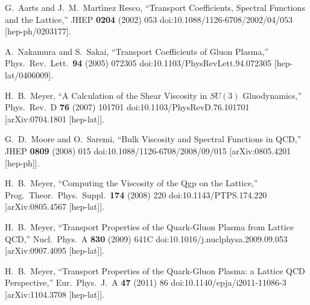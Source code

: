 \documentclass[a4paper,11pt]{article}
\begin{document}
\begin{thebibliography}{99}
  
  G.~Aarts and J.~M.~Mart{\'\i ne}z Resco,
  ``Transport Coefficients, Spectral Functions and the Lattice,''
  JHEP {\bf 0204} (2002) 053
  doi:10.1088/1126-6708/2002/04/053
  [hep-ph/0203177].


  A.~Nakamura and S.~Sakai,
  ``Transport Coefficients of Gluon Plasma,''
  Phys.\ Rev.\ Lett.\  {\bf 94} (2005) 072305
  doi:10.1103/PhysRevLett.94.072305
  [hep-lat/0406009].


  
  H.~B.~Meyer,
  ``A Calculation of the Shear Viscosity in $SU(3)$ Gluodynamics,''
  Phys.\ Rev.\ D {\bf 76} (2007) 101701
  doi:10.1103/PhysRevD.76.101701
  [arXiv:0704.1801 [hep-lat]].


  G.~D.~Moore and O.~Saremi,
  ``Bulk Viscosity and Spectral Functions in QCD,''
  JHEP {\bf 0809} (2008) 015
  doi:10.1088/1126-6708/2008/09/015
  [arXiv:0805.4201 [hep-ph]].


  H.~B.~Meyer,
  ``Computing the Viscosity of the Qgp on the Lattice,''
  Prog.\ Theor.\ Phys.\ Suppl.\  {\bf 174} (2008) 220
  doi:10.1143/PTPS.174.220
  [arXiv:0805.4567 [hep-lat]].

  H.~B.~Meyer,
  ``Transport Properties of the Quark-Gluon Plasma from Lattice QCD,''
  Nucl.\ Phys.\ A {\bf 830} (2009) 641C
  doi:10.1016/j.nuclphysa.2009.09.053
  [arXiv:0907.4095 [hep-lat]].

  
  
  H.~B.~Meyer,
  ``Transport Properties of the Quark-Gluon Plasma: a Lattice QCD Perspective,''
  Eur.\ Phys.\ J.\ A {\bf 47} (2011) 86
  doi:10.1140/epja/i2011-11086-3
  [arXiv:1104.3708 [hep-lat]].



\end{thebibliography}
\end{document}
